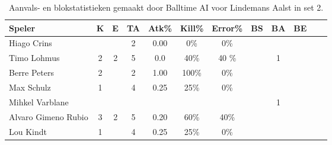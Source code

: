 \begin{table}[ht!]
  \centering
  \scriptsize
  \begin{tabular}{|l|c|c|c|c|c|c|c|c|c|c|c|} \hline
    \textbf{Speler} &  K & E & TA & Atk\% & Kill\% & Error\% & BS & BA & BE \\ \hline
    Hiago Crins &  &  & 2 & 0.00 & 0\% & 0\% &  &  &\\
    Timo Lohmus & 2 & 2 & 5 & 0.0 & 40\% & 40 \%&  & 1 & \\
    Berre Peters & 2 &  & 2 & 1.00 & 100\% & 0\% &   &  & \\
    Max Schulz & 1 &  & 4 & 0.25 & 25\% & 0\% &   &  & \\
    Mihkel Varblane &   &   &   &   &   &   &  & 1 &\\
    Alvaro Gimeno Rubio & 3 & 2 & 5 & 0.20 & 60\% & 40\% &   &  & \\
    Lou Kindt & 1 &  & 4 & 0.25 & 25\% & 0\% &   &  & \\ \hline
  \end{tabular}
  \caption[Aanvals- en blokstatistieken gemaakt door Balltime AI voor Lindemans Aalst in set 2]{\label{tab:PL3AttBlockAalstAI2}Aanvals- en blokstatistieken gemaakt door Balltime AI voor Lindemans Aalst in set 2.}
\end{table}
